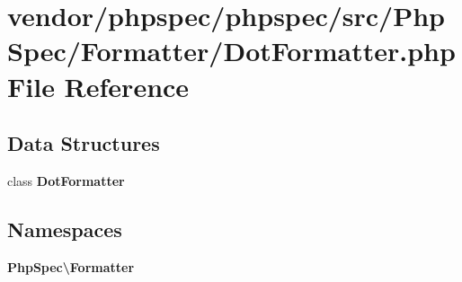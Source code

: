 \section{vendor/phpspec/phpspec/src/\+Php\+Spec/\+Formatter/\+Dot\+Formatter.php File Reference}
\label{_dot_formatter_8php}
\subsection*{Data Structures}
\begin{DoxyCompactItemize}
\item 
class {\bf Dot\+Formatter}
\end{DoxyCompactItemize}
\subsection*{Namespaces}
\begin{DoxyCompactItemize}
\item 
 {\bf Php\+Spec\textbackslash{}\+Formatter}
\end{DoxyCompactItemize}
